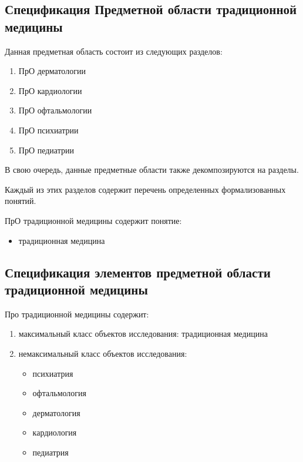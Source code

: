 \subsection{Спецификация Предметной области традиционной медицины}
Данная предметная область состоит из следующих разделов:
\begin{enumerate}
	\item ПрО дерматологии
	\item ПрО кардиологии
	\item ПрО офтальмологии 
	\item ПрО психиатрии
	\item ПрО педиатрии\\
\end{enumerate}

В свою очередь, данные предметные области также декомпозируются на разделы.

Каждый из этих разделов содержит перечень определенных формализованных понятий.

ПрО традиционной медицины содержит понятие:
\begin{itemize}
	\item традиционная медицина\\
\end{itemize}

\subsection{Спецификация элементов предметной области традиционной медицины}
Про традиционной медицины содержит:
\begin{enumerate}
	\item максимальный класс объектов исследования: традиционная медицина
	\item немаксимальный класс объектов исследования: \begin{itemize}
		\item психиатрия
		\item офтальмология
		\item дерматология 
		\item кардиология   
		\item педиатрия\\
	\end{itemize}
\end{enumerate}

